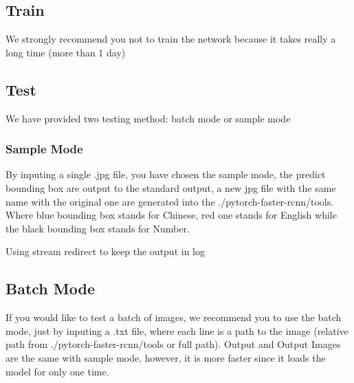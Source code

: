 \documentclass{IEEEtran}
\begin{document}
\subsection{Train}
We strongly recommend you not to train the network because it takes really a long time (more than 1 day)



\subsection{Test}

We have provided two testing method: batch mode or sample mode


\subsubsection{Sample Mode}
By inputing a single .jpg file, you have chosen the sample mode, the predict bounding box are output to the 
standard output, a new jpg file with the same name with the original one are generated into the ./pytorch-faster-rcnn/tools. Where blue bounding box stands for Chinese, red one stands for English while the black bounding box stands for Number.

Using stream redirect to keep the output in log

\subsection{Batch Mode}
If you would like to test a batch of images, we recommend you to use the batch mode, just by inputing a .txt file, where each line is a path to the image (relative path from ./pytorch-faster-rcnn/tools or full path). Output and Output Images are the same with sample mode, however, it is more faster since it loads the model for only one time.


\end{document}
